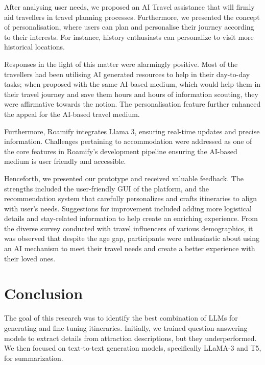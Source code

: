 \documentclass[manuscript,review,anonymous]{acmart}
\begin{document}
   After analysing user needs, we proposed an AI Travel assistance that will firmly aid travellers in travel planning processes. Furthermore, we presented the concept of personalisation, where users can plan and personalise their journey according to their interests. For instance, history enthusiasts can personalize to visit more historical locations.
    
    Responses in the light of this matter were alarmingly positive. Most of the travellers had been utilising AI generated resources to help in their day-to-day tasks; when proposed with the same AI-based medium, which would help them in their travel journey and save them hours and hours of information scouting, they were affirmative towards the notion. The personalisation feature further enhanced the appeal for the AI-based travel medium.
    
    Furthermore, Roamify integrates Llama 3, ensuring real-time updates and precise information. Challenges pertaining to accommodation were addressed as one of the core features in Roamify's development pipeline ensuring the AI-based medium is user friendly and accessible.
    
    Henceforth, we presented our prototype and received valuable feedback. The strengths included the user-friendly GUI of the platform, and the recommendation system that carefully personalizes and crafts itineraries to align with user's needs. Suggestions for improvement included adding more logistical details and stay-related information to help create an enriching experience. From the diverse survey conducted with travel influencers of various demographics, it was observed that despite the age gap, participants were enthusiastic about using an AI mechanism to meet their travel needs and create a better experience with their loved ones.

\vspace{-7pt}

\section{Conclusion}
    
    The goal of this research was to identify the best combination of LLMs for generating and fine-tuning itineraries. Initially, we trained question-answering models to extract details from attraction descriptions, but they underperformed. We then focused on text-to-text generation models, specifically LLaMA-3 and T5, for summarization.
    
\end{document}
